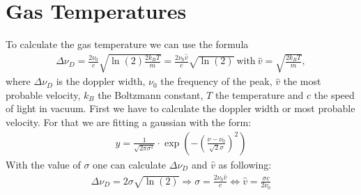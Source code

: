 \section{Gas Temperatures}
\label{sec:temp}
To calculate the gas temperature we can use the formula
\begin{gather}
    \Delta \nu_D = \frac{2\nu_0}{c}\sqrt{\ln(2)\frac{2k_BT}{m}} = \frac{2\nu_0\hat{v}}{c}\sqrt{\ln(2)}~\text{with}~\hat{v}= \sqrt{\frac{2k_BT}{m}},
\end{gather}
where $\Delta\nu_D$ is the doppler width, $\nu_0$ the frequency of the peak, $\hat{v}$ the most probable velocity, $k_B$ the Boltzmann constant, $T$ the temperature and $c$ the speed of light in vacuum.
First we have to calculate the doppler width or most probable velocity. For that we are fitting a gaussian with the form:
\begin{gather}
    y = \frac{1}{\sqrt{2\pi \sigma^2}}\cdot \exp(-\left(\frac{\nu-\nu_0}{\sqrt{2}\sigma}\right)^2)
\end{gather}
With the value of $\sigma$ one can calculate $\Delta\nu_D$ and $\hat{v}$ as following:
\begin{gather}
    \Delta\nu_D = 2\sigma\sqrt{\ln(2)} \Rightarrow \sigma = \frac{2\nu_0\hat{v}}{c} \Leftrightarrow \hat{v} = \frac{\sigma c}{2 \nu_0}
\end{gather}